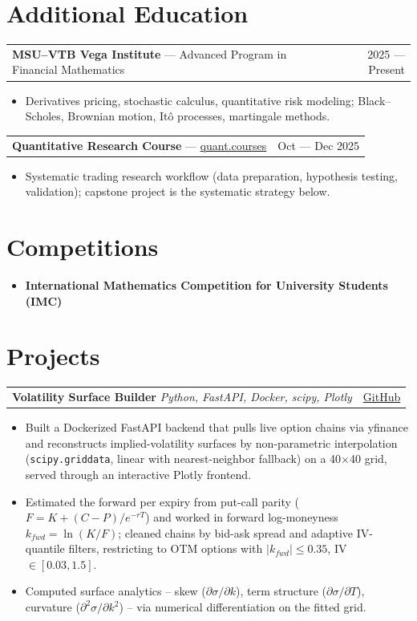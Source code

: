 \documentclass[10pt]{article}
\makeatletter
\newcommand{\smallit}[1]{{\small\textit{#1}}}
\newcommand{\rrow}[2]{%
  \begin{tabularx}{\textwidth}{@{}X r@{}}%
    #1 & #2\\%
  \end{tabularx}%
}
\makeatother
\begin{document}
\section*{Additional Education}

\rrow{\textbf{MSU--VTB Vega Institute} --- Advanced Program in Financial Mathematics}{2025 --- Present}
\begin{itemize}
  \item Derivatives pricing, stochastic calculus, quantitative risk modeling; Black--Scholes, Brownian motion, It\^o processes, martingale methods.
\end{itemize}

\rrow{\textbf{Quantitative Research Course} --- \href{https://quant.courses/}{quant.courses}}{Oct --- Dec 2025}
\begin{itemize}
  \item Systematic trading research workflow (data preparation, hypothesis testing, validation); capstone project is the systematic strategy below.
\end{itemize}

\section*{Competitions}
\begin{itemize}
  \item \textbf{International Mathematics Competition for University Students (IMC)}
\end{itemize}

\section*{Projects}

\rrow{\textbf{Volatility Surface Builder} \; \smallit{Python, FastAPI, Docker, scipy, Plotly}}{\href{https://github.com/tenzenmonsta/Volatility-Surface-Builder}{GitHub}}
\begin{itemize}
  \item Built a Dockerized FastAPI backend that pulls live option chains via yfinance and reconstructs implied-volatility surfaces by non-parametric interpolation (\texttt{scipy.griddata}, linear with nearest-neighbor fallback) on a 40$\times$40 grid, served through an interactive Plotly frontend.
  \item Estimated the forward per expiry from put-call parity ($F = K + (C-P)/e^{-rT}$) and worked in forward log-moneyness $k_{fwd}=\ln(K/F)$; cleaned chains by bid-ask spread and adaptive IV-quantile filters, restricting to OTM options with $|k_{fwd}|\le 0.35$, IV $\in[0.03,1.5]$.
  \item Computed surface analytics -- skew ($\partial\sigma/\partial k$), term structure ($\partial\sigma/\partial T$), curvature ($\partial^2\sigma/\partial k^2$) -- via numerical differentiation on the fitted grid.
\end{itemize}
\end{document}
